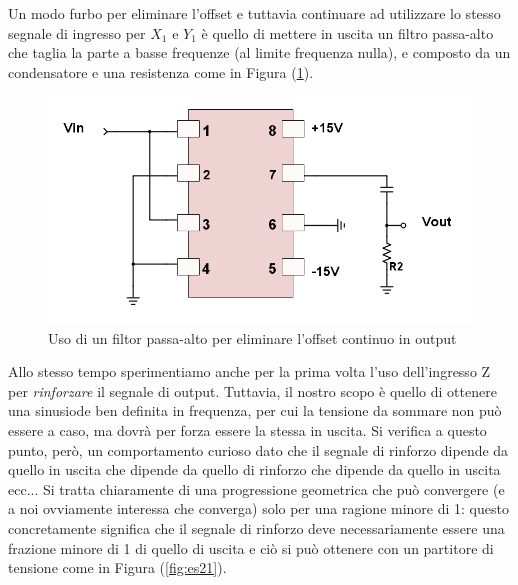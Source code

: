\documentclass[10pt,letterpaper]{article}
\begin{document}
Un modo furbo per eliminare l'offset e tuttavia continuare ad utilizzare lo stesso segnale di ingresso per $X_1$ e $Y_1$ è quello di mettere in uscita un filtro passa-alto che taglia la parte a basse frequenze (al limite frequenza nulla), e composto da un condensatore e una resistenza come in Figura (\ref{fig:es_20_togliere_offset}).\\

\begin{figure}
\centering
\includegraphics[width=0.8\linewidth]{./es_20_togliere_offset}
\caption{Uso di un filtor passa-alto per eliminare l'offset continuo in output}
\label{fig:es_20_togliere_offset}
\end{figure}


Allo stesso tempo sperimentiamo anche per la prima volta l'uso dell'ingresso Z per \textit{rinforzare} il segnale di output. Tuttavia, il nostro scopo è quello di ottenere una sinusiode ben definita in frequenza, per cui la tensione da sommare non può essere a caso, ma dovrà per forza essere la stessa in uscita. Si verifica a questo punto, però, un comportamento curioso dato che il segnale di rinforzo dipende da quello in uscita che dipende da quello di rinforzo che dipende da quello in uscita ecc... Si tratta chiaramente di una progressione geometrica che può convergere (e a noi ovviamente interessa che converga) solo per una ragione minore di 1: questo concretamente significa che il segnale di rinforzo deve necessariamente essere una frazione minore di 1 di quello di uscita e ciò si può ottenere con un partitore di tensione come in Figura (\ref{fig:es21}). \\
\end{document}

